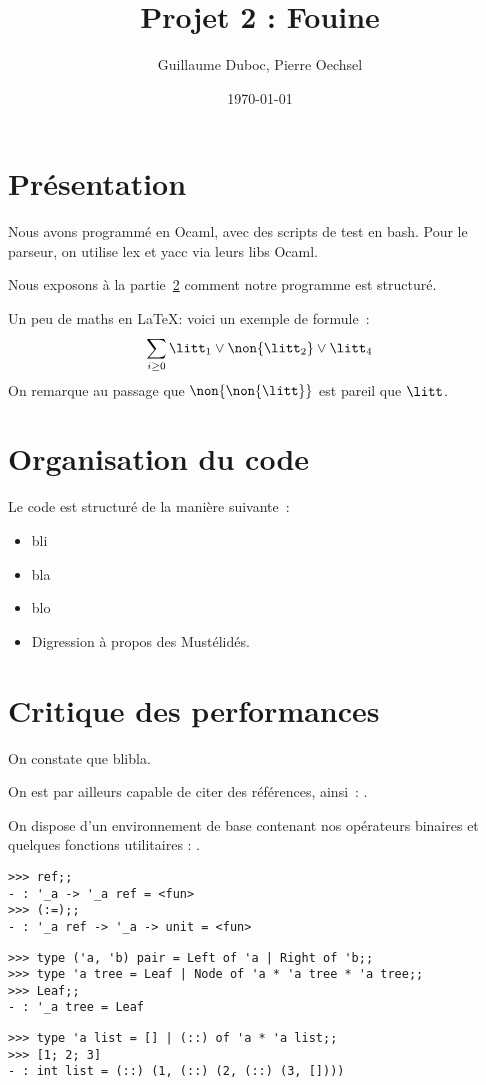 \documentclass[paper=a4, fontsize=11pt]{scrartcl}
\title{Projet 2 : Fouine}
\author{Guillaume Duboc, Pierre Oechsel}
\date{\today}
\begin{document}
\maketitle


\section{Présentation}

Nous avons programmé en Ocaml, avec des scripts de test en bash.
Pour le parseur, on utilise lex et yacc via leurs libs Ocaml.

Nous exposons à la partie~\ref{s:orga} comment notre programme est structuré.


Un peu de maths en \LaTeX: voici un exemple de formule~:
$$
\sum_{i\geq 0} \litt_1\lor\non{\litt_2}\lor\litt_4
$$
On remarque au passage que $\non{\non{\litt}}$ est pareil que $\litt$.

\section{Organisation du code}
\label{s:orga}

Le code est structuré de la manière suivante~:
\begin{itemize}
\item bli
\item bla
\item blo
\item Digression à propos des Mustélidés.
\end{itemize}

\section{Critique des performances}

On constate que blibla.


On est par ailleurs capable de citer des références, ainsi~: \cite{ProjInt16}.



On dispose d'un environnement de base contenant nos opérateurs binaires et quelques fonctions utilitaires : .
\begin{verbatim}
>>> ref;;
- : '_a -> '_a ref = <fun>
>>> (:=);;
- : '_a ref -> '_a -> unit = <fun>
\end{verbatim}

\begin{verbatim}
>>> type ('a, 'b) pair = Left of 'a | Right of 'b;;
>>> type 'a tree = Leaf | Node of 'a * 'a tree * 'a tree;;
>>> Leaf;;
- : '_a tree = Leaf
\end{verbatim}
\begin{verbatim}
>>> type 'a list = [] | (::) of 'a * 'a list;;
>>> [1; 2; 3]
- : int list = (::) (1, (::) (2, (::) (3, [])))
\end{verbatim}
\end{document}

